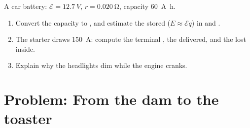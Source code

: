 \begin{exercise}[$\star\star\star$]\label{exo:g11:circuits-and-power:15}
A car battery: $\mathcal{E} = \qty{12.7}{V}$, $r = \qty{0.020}{\ohm}$,
capacity \qty{60}{A.h}.
\begin{enumerate}
  \item Convert the capacity to , and estimate the stored 
        ($E \approx \mathcal{E} q$) in  and .
  \item The starter draws \qty{150}{A}: compute the terminal , the
         delivered, and the  lost inside.
  \item Explain why the headlights dim while the engine cranks.
\end{enumerate}
\end{exercise}

\section{Problem: From the dam to the toaster}

